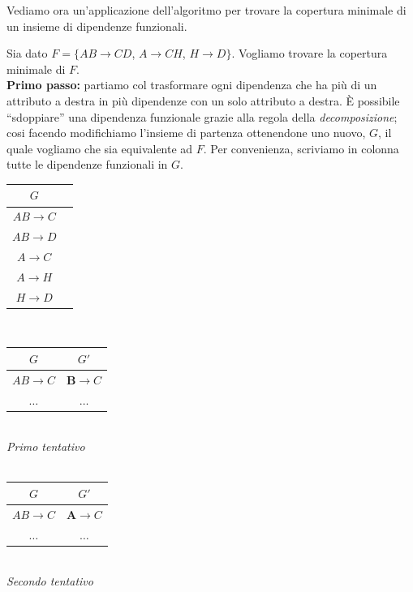  Vediamo ora un'applicazione dell'algoritmo per trovare la copertura minimale di un insieme di dipendenze funzionali.
\begin{exmp}
Sia dato $F = \{AB\rightarrow CD$, $A\rightarrow CH$, $H\rightarrow D\}$. Vogliamo trovare la copertura minimale di $F$.\\

\noindent \textbf{Primo passo:} partiamo col trasformare ogni dipendenza che ha più di un attributo a destra in più dipendenze
con un solo attributo a destra. \`E possibile ``sdoppiare'' una dipendenza funzionale grazie alla regola della \emph{decomposizione};
cosi facendo modifichiamo l'insieme di partenza ottenendone uno nuovo, $G$, il quale vogliamo che sia equivalente ad $F$.
Per convenienza, scriviamo in colonna tutte le dipendenze funzionali in $G$.

\begin{multicols}{3}
\begin{tabular}{|c|c|}
  \hline
  $G$\\
  \hline
  $AB\rightarrow C$ \\
  $AB\rightarrow D$ \\
  $A\rightarrow C$ \\
  $A\rightarrow H$ \\
  $H\rightarrow D$ \\
  \hline
 \end{tabular}\\
 
 \begin{tabular}{|c|c|}
  \hline
  $G$ & $G'$\\
  \hline
  $AB\rightarrow C$ & $\mathbf{B}\rightarrow C$\\
  $\ldots$ & $\ldots$ \\
  \hline
 \end{tabular}\\
 
 \emph{\small Primo tentativo}\\\\

 \begin{tabular}{|c|c|}
  \hline
  $G$ & $G'$\\
  \hline
  $AB\rightarrow C$ & $\mathbf{A}\rightarrow C$\\
  $\ldots$ & $\ldots$ \\
  \hline
 \end{tabular}\\
  
  \emph{\small Secondo tentativo}\\
\end{multicols}


\end{exmp}

